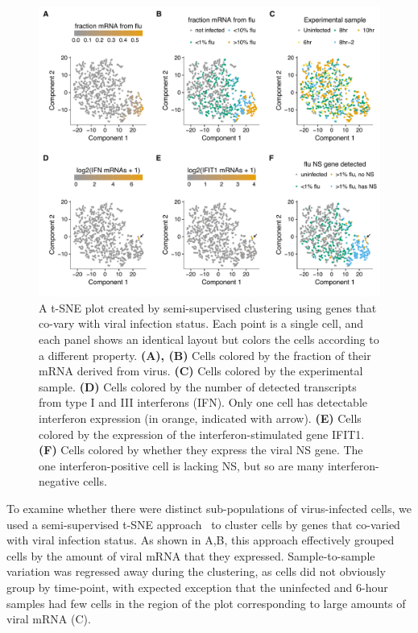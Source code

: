 \documentclass[9pt,lineno]{elife}
\begin{document}
\begin{figure}
\centerline{\includegraphics[width=0.9\linewidth]{figures/p_small_tsne_merge_manualedits.pdf}}
\caption{\label{fig:tsne}
A t-SNE plot created by semi-supervised clustering using genes that co-vary with viral infection status.
Each point is a single cell, and each panel shows an identical layout but colors the cells according to a different property.
{\bf (A), (B)}
Cells colored by the fraction of their mRNA derived from virus.
{\bf (C)}
Cells colored by the experimental sample.
{\bf (D)}
Cells colored by the number of detected transcripts from type I and III interferons (IFN).
Only one cell has detectable interferon expression (in orange, indicated with arrow).
{\bf (E)}
Cells colored by the expression of the interferon-stimulated gene IFIT1.
{\bf (F)}
Cells colored by whether they express the viral NS gene.
The one interferon-positive cell is lacking NS, but so are many interferon-negative cells.
}
\end{figure}

To examine whether there were distinct sub-populations of virus-infected cells, we used a semi-supervised t-SNE approach~\citep{VanderMaaten:2008tm} to cluster cells by genes that co-varied with viral infection status.
As shown in A,B, this approach effectively grouped cells by the amount of viral mRNA that they expressed.
Sample-to-sample variation was regressed away during the clustering, as cells did not obviously group by time-point, with expected exception that the uninfected and 6-hour samples had few cells in the region of the plot corresponding to large amounts of viral mRNA (C).
\end{document}
